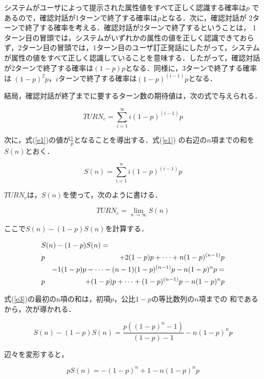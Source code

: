 システムがユーザによって提示された属性値をすべて正しく認識する確率は$p$ 
であるので，確認対話が1ターンで終了する確率は$p$となる．次に，確認対話が
2ターンで終了する確率を考える．確認対話が2ターンで終了するということは，
1ターン目の冒頭では，システムがいずれかの属性の値を正しく認識できておら
ず，2ターン目の冒頭では，1ターン目のユーザ訂正発話にしたがって，システム
が属性の値をすべて正しく認識していることを意味する．したがって，確認対話
が2ターンで終了する確率は$(1-p)p$となる．同様に，3ターンで終了する確率は
$(1-p)^{2}p$，$i$ターンで終了する確率は$(1-p)^{(i-1)}p$となる．

結局，確認対話が終了までに要するターン数の期待値は，次の式で与えられる．

\begin{equation}
\label{e1}
TURN_{c} = \sum_{i=1}^{\infty}i(1-p)^{(i-1)}p
\end{equation}


次に，式(\ref{e1})の値が$\frac{1}{p}$となることを導出する．式(\ref{e1}) 
の右辺の$n$項までの和を$S(n)$とおく．

\begin{equation}
S(n) = \sum_{i=1}^{n}i(1-p)^{(i-1)}p
\end{equation}

$TURN_{c}$は，$S(n)$を使って，次のように書ける．

\begin{equation}
\label{e2}
TURN_{c} = \lim_{n \rightarrow \infty}S(n)
\end{equation}

ここで$S(n) - (1-p)S(n)$を計算する．


\begin{eqnarray}
\lefteqn{S(n) - (1-p)S(n)=} \nonumber \\
& p & + 2(1-p)p + \cdots + n(1-p)^{(n-1)}p \nonumber \\
&   & - 1(1-p)p - \cdots - (n-1)(1-p)^{(n-1)}p - n(1-p)^{n}p = \nonumber \\
\label{e3}
& p & + (1-p)p + \cdots + (1-p)^{(n-1)}p - n(1-p)^{n}p
\end{eqnarray}

式(\ref{e3})の最初のn項の和は，初項$p$，公比$1-p$の等比数列の$n$項までの
和であるから，次が導かれる．

\begin{equation}
S(n) - (1-p)S(n) = \frac{p((1-p)^{n} -1)}{(1-p)-1} - n(1-p)^{n}p
\end{equation}

辺々を変形すると，

\begin{equation}
pS(n) = -(1-p)^{n} + 1 - n(1-p)^{n}p
\end{equation}

